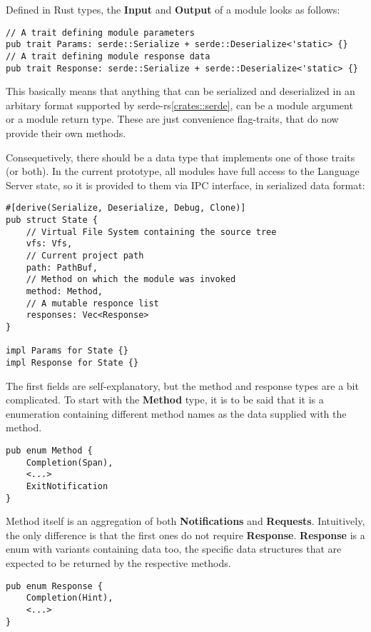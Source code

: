 Defined in Rust types, the \textbf{Input} and \textbf{Output} of a module looks as follows:
\begin{verbatim}
// A trait defining module parameters
pub trait Params: serde::Serialize + serde::Deserialize<'static> {}
// A trait defining module response data
pub trait Response: serde::Serialize + serde::Deserialize<'static> {}
\end{verbatim}
This basically means that anything that can be serialized and deserialized in an arbitary format
supported by serde-rs\ref{crates::serde}, can be a module argument or a module return type.
These are just convenience flag-traits, that do now provide their own methods.

Consequetively, there should be a data type that implements one of those traits (or both).
In the current prototype, all modules have full access to the Language Server state, so it is
provided to them via IPC interface, in serialized data format:
\begin{verbatim}
#[derive(Serialize, Deserialize, Debug, Clone)]
pub struct State {
    // Virtual File System containing the source tree
    vfs: Vfs,
    // Current project path
    path: PathBuf,
    // Method on which the module was invoked
    method: Method,
    // A mutable responce list
    responses: Vec<Response>
}

impl Params for State {}
impl Response for State {}

\end{verbatim}

The first fields are self-explanatory, but the method and response types are a bit complicated.
To start with the \textbf{Method} type, it is to be said that it is a enumeration containing
different method names as the data supplied with the method.
\begin{verbatim}
pub enum Method {
    Completion(Span),
    <...>
    ExitNotification
}
\end{verbatim}

Method itself is an aggregation of both \textbf{Notifications}
and \textbf{Requests}. Intuitively, the only difference is that the first ones do not require \textbf{Response}.
\textbf{Response} is a enum with variants containing data too,
the specific data structures that are expected to be returned by the respective methods.
\begin{verbatim}
pub enum Response {
    Completion(Hint),
    <...>
}
\end{verbatim}

